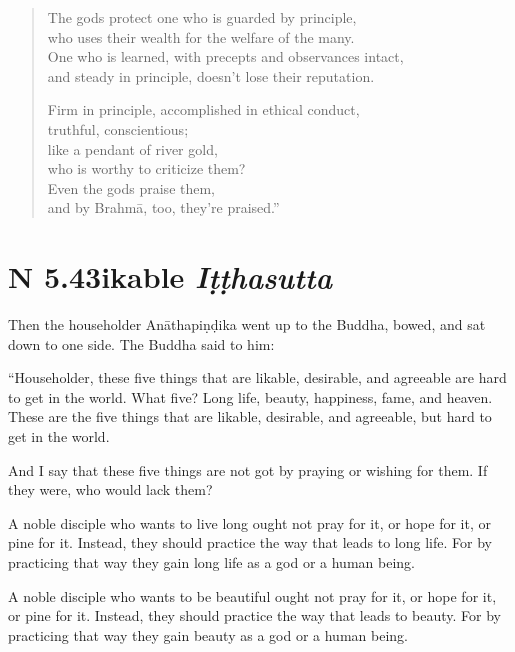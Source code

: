 \documentclass[12pt,openany]{book}%
\newcommand*{\suttatitleacronym}[1]{\smaller[2]{#1}\vspace*{.3em}}
\newcommand*{\suttatitletranslation}[1]{\linebreak{#1}}
\newcommand*{\suttatitleroot}[1]{\linebreak\smaller[2]\itshape{#1}}
\newcommand*{\tocacronym}[1]{\hspace*{-3.3em}{#1}\quad}
\newcommand*{\toctranslation}[1]{#1}
\newcommand*{\tocroot}[1]{(\textit{#1})}
\begin{document}
\begin{verse}%
The gods protect one who is guarded by principle, \\
who uses their wealth for the welfare of the many. \\
One who is learned, with precepts and observances intact, \\
and steady in principle, doesn’t lose their reputation. 

Firm in principle, accomplished in ethical conduct, \\
truthful, conscientious; \\
like a pendant of river gold, \\
who is worthy to criticize them? \\
Even the gods praise them, \\
and by \textsanskrit{Brahmā}, too, they’re praised.” 

%
\end{verse}

%
\section*{{\suttatitleacronym AN 5.43}{\suttatitletranslation Likable }{\suttatitleroot Iṭṭhasutta}}
\addcontentsline{toc}{section}{\tocacronym{AN 5.43} \toctranslation{Likable } \tocroot{Iṭṭhasutta}}

Then the householder \textsanskrit{Anāthapiṇḍika} went up to the Buddha, bowed, and sat down to one side. The Buddha said to him: 

“Householder, these five things that are likable, desirable, and agreeable are hard to get in the world. What five? Long life, beauty, happiness, fame, and heaven. These are the five things that are likable, desirable, and agreeable, but hard to get in the world. 

And I say that these five things are not got by praying or wishing for them. If they were, who would lack them? 

A noble disciple who wants to live long ought not pray for it, or hope for it, or pine for it. Instead, they should practice the way that leads to long life. For by practicing that way they gain long life as a god or a human being. 

A noble disciple who wants to be beautiful ought not pray for it, or hope for it, or pine for it. Instead, they should practice the way that leads to beauty. For by practicing that way they gain beauty as a god or a human being. 
\end{document}
